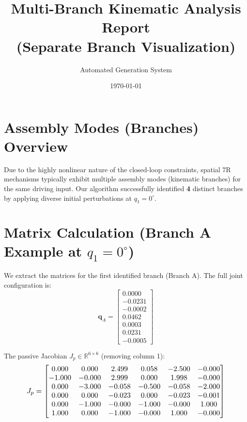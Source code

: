 \documentclass[12pt,a4paper]{article}
\title{\textbf{Multi-Branch Kinematic Analysis Report \\ (Separate Branch Visualization)}}
\author{Automated Generation System}
\date{\today}
\begin{document}
\maketitle

\section{Assembly Modes (Branches) Overview}
Due to the highly nonlinear nature of the closed-loop constraints, spatial 7R mechanisms typically exhibit multiple assembly modes (kinematic branches) for the same driving input. Our algorithm successfully identified \textbf{4} distinct branches by applying diverse initial perturbations at $q_1 = 0^\circ$.

\section{Matrix Calculation (Branch A Example at $q_1 = 0^\circ$)}
We extract the matrices for the first identified branch (Branch A). The full joint configuration is:
\begin{equation}
    \mathbf{q}_A = \begin{bmatrix} 0.0000 \\ -0.0231 \\ -0.0002 \\ 0.0462 \\ 0.0003 \\ 0.0231 \\ -0.0005 \end{bmatrix}
\end{equation}

The passive Jacobian $J_p \in \mathbb{R}^{6 \times 6}$ (removing column 1):
\begin{equation}
    \resizebox{0.85\textwidth}{!}{$ J_p = \begin{bmatrix}
  0.000 & 0.000 & 2.499 & 0.058 & -2.500 & -0.000 \\
  -1.000 & -0.000 & 2.999 & 0.000 & 1.998 & -0.000 \\
  0.000 & -3.000 & -0.058 & -0.500 & -0.058 & -2.000 \\
  0.000 & 0.000 & -0.023 & 0.000 & -0.023 & -0.001 \\
  0.000 & -1.000 & -0.000 & -1.000 & -0.000 & 1.000 \\
  1.000 & 0.000 & -1.000 & -0.000 & 1.000 & -0.000
\end{bmatrix} $}
\end{equation}
\end{document}
